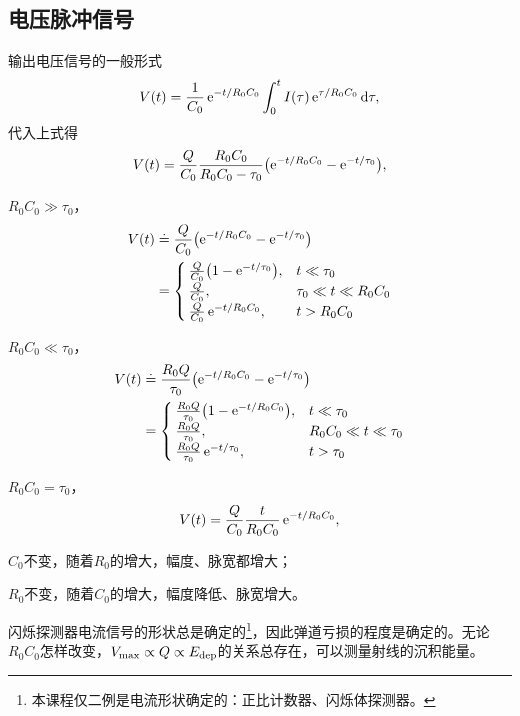 \subsection{电压脉冲信号}

输出电压信号的一般形式
\[
	V(t) = \frac1{C_0}\mathop{}\!\mathrm{e}^{-t/R_0C_0}\int_0^tI(\tau)\mathop{}\!\mathrm{e}^{\tau/R_0C_0}\mathop{}\!\mathrm{d}\tau,
\]
代入上式得
\begin{equation}\label{eq:nrd-scintillation-voltage-pulse}
	V(t) = \frac Q{C_0}\frac{R_0C_0}{R_0C_0 - \tau_0}\bigl(\mathop{}\!\mathrm{e}^{-t/R_0C_0} - \mathop{}\!\mathrm{e}^{-t/\tau_0}\bigr),
\end{equation}
\begin{compactitem}
	\item $R_0C_0 \gg \tau_0$，
	\begin{align*}
		V(t) &\doteq \frac Q{C_0}\bigl(\mathop{}\!\mathrm{e}^{-t/R_0C_0} - \mathop{}\!\mathrm{e}^{-t/\tau_0}\bigr)\\
		&= \begin{cases}
			\frac Q{C_0}\bigl(1 - \mathop{}\!\mathrm{e}^{-t/\tau_0}\bigr),&t \ll \tau_0\\
			\frac Q{C_0},&\tau_0 \ll t \ll R_0C_0\\
			\frac Q{C_0}\mathop{}\!\mathrm{e}^{-t/R_0C_0},&t > R_0C_0
		\end{cases}
	\end{align*}
	\item $R_0C_0 \ll \tau_0$，
	\begin{align*}
		V(t) &\doteq \frac{R_0Q}{\tau_0}\bigl(\mathop{}\!\mathrm{e}^{-t/R_0C_0} - \mathop{}\!\mathrm{e}^{-t/\tau_0}\bigr)\\
		&= \begin{cases}
			\frac{R_0Q}{\tau_0}\bigl(1 - \mathop{}\!\mathrm{e}^{-t/R_0C_0}\bigr),&t \ll \tau_0\\
			\frac {R_0Q}{\tau_0},&R_0C_0 \ll t \ll \tau_0\\
			\frac {R_0Q}{\tau_0}\mathop{}\!\mathrm{e}^{-t/\tau_0},&t > \tau_0
		\end{cases}
	\end{align*}
	\item $R_0C_0 = \tau_0$，
	\begin{equation}\label{eq:nrd-matched-scintillation-time-constants}
		V(t) = \frac{Q}{C_0}\frac{t}{R_0C_0}\mathop{}\!\mathrm{e}^{-t/R_0C_0},
	\end{equation}
	
	\item $C_0$不变，随着$R_0$的增大，幅度、脉宽都增大；
	\item $R_0$不变，随着$C_0$的增大，幅度降低、脉宽增大。
\end{compactitem}

闪烁探测器电流信号的形状总是确定的\footnote{本课程仅二例是电流形状确定的：正比计数器、闪烁体探测器。}，因此弹道亏损的程度是确定的。无论$R_0C_0$怎样改变，$V_{\max} \propto Q \propto E_{\mathrm{dep}}$的关系总存在，可以测量射线的沉积能量。

